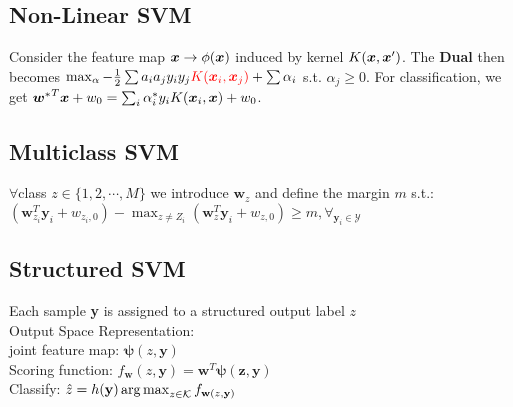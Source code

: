 \subsection*{Non-Linear SVM}
Consider the feature map ${\bm{x}} \rightarrow \phi({\bm{x}})$ induced by kernel $K({\bm{x}}, {\bm{x}}')$. The \textbf{Dual} then becomes $\max_\alpha -\frac{1}{2}\sum a_ia_jy_iy_j{\color{red}K({\bm{x}}_i, {\bm{x}}_j)} + \sum\alpha_i$ s.t.
$\alpha_j\geq 0$. For classification, we get ${{\bm{w}}^*}^T{\bm{x}} + w_0 = \sum_i \alpha_i^*y_iK({\bm{x}}_i, {\bm{x}}) + w_0$.

\subsection*{Multiclass SVM}
$\forall$class $z\in\{1,2,\cdots,M\}$ we introduce $\mathbf{w}_z$ and define the margin $m$ s.t.:\\
$(\mathbf{w}_{z_i}^T\mathbf{y}_i+w_{z_i,0})-\max_{z\not=Z_i}(\mathbf{w}_z^T\mathbf{y}_i+w_{z,0})\geq m, \forall_{\mathbf{y}_i\in \mathcal{Y}}$

\subsection*{Structured SVM}
Each sample \textbf{y} is assigned to a structured output label $z$\\
Output Space Representation:\\
joint feature map: $\mathbf{\psi}(z,\mathbf{y})$\\
Scoring function: $f_{\mathbf{w}}(z,\mathbf{y})=\mathbf{w}^T\mathbf{\psi(z, \mathbf{y})}$\\
Classify: $\hat{z}=h(\mathbf{y})\operatorname*{arg\,max}_{z\in\mathcal{K}}f_{\mathbf{w}(z, \mathbf{y})}$


